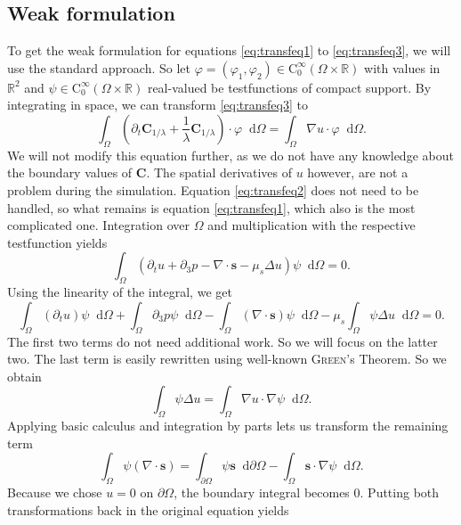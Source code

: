 \documentclass[12pt,a4paper,twoside, open=right]{scrreprt}
\theoremstyle{definition}
\theoremstyle{plain}
\newcommand{\rr}{\mathbb{R}}
\newcommand{\bfs}{\bm{s}}
\newcommand{\bfC}{\bm{C}}
\newcommand{\D}{\mathop{}\!\mathrm{d}}
\begin{document}
\subsection{Weak formulation}
To get the weak formulation for equations \eqref{eq:transfeq1} to \eqref{eq:transfeq3}, we will use the standard approach. So let $\varphi = (\varphi_1,\varphi_2)\in \mathrm{C}^\infty_0(\Omega\times\rr)$ with values in $\rr^2$ and $\psi\in \mathrm{C}^\infty_0(\Omega\times\rr)$ real-valued be testfunctions of compact support. By integrating in space, we can transform \eqref{eq:transfeq3} to 
\begin{equation}
    \int_\Omega(\partial_t\bfC_{1/\lambda}+\frac{1}{\lambda}\bfC_{1/\lambda})\cdot\varphi\D\Omega = 
   \int_\Omega \nabla u\cdot \varphi\D\Omega.
\end{equation}
We will not modify this equation further, as we do not have any knowledge about the boundary values of $\bfC$. The spatial derivatives of $u$ however, are not a problem during the simulation. Equation \eqref{eq:transfeq2} does not need to be handled, so what remains is equation \eqref{eq:transfeq1}, which also is the most complicated one. Integration over $\Omega$ and multiplication with the respective testfunction yields
\begin{equation}
    \int_\Omega(\partial_t u + \partial_3 p -\nabla\cdot \bfs -\mu_s\Delta u)\psi\D\Omega = 0.
\end{equation}
Using the linearity of the integral, we get
\begin{equation}
    \int_\Omega(\partial_t u)\psi\D\Omega +\int_\Omega\partial_3 p\psi\D\Omega -\int_\Omega(\nabla\cdot \bfs)\psi\D\Omega -\mu_s\int_\Omega\psi\Delta u\D\Omega=0.
\end{equation}
The first two terms do not need additional work. So we will focus on the latter two. The last term is easily rewritten using well-known \textsc{Green}'s Theorem. So we obtain
\begin{equation}
    \int_\Omega \psi\Delta u = \int_\Omega\nabla u\cdot \nabla\psi\D\Omega.
\end{equation}
Applying basic calculus and integration by parts lets us transform the remaining term
\begin{equation}
    \int_\Omega \psi(\nabla\cdot\bfs) =\int_{\partial\Omega}\psi\bfs\D\partial\Omega -\int_\Omega\bfs\cdot\nabla\psi\D\Omega.
\end{equation}
Because we chose $u = 0$ on $\partial\Omega$, the boundary integral becomes $0$. Putting both transformations back in the original equation yields
\end{document}
